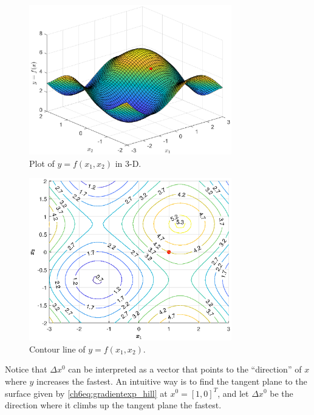 \begin{figure}
	\centering
	\includegraphics[width=250pt]{chapters/chapter6/figures/gradientexp_3d.eps}
	\caption{Plot of $y=f(x_1, x_2)$ in 3-D.} \label{ch6fig:gradientexp_3d}
\end{figure}
\begin{figure}
	\centering
	\includegraphics[width=250pt]{chapters/chapter6/figures/gradientexp_contour.eps}
	\caption{Contour line of $y=f(x_1, x_2)$.} \label{ch6fig:gradientexp_contour}
\end{figure}

Notice that $\Delta x^0$ can be interpreted as a vector that points to the ``direction'' of $x$ where $y$ increases the fastest. An intuitive way is to find the tangent plane to the surface given by \eqref{ch6eq:gradientexp_hill} at $x^0=[1,0]^T$, and let $\Delta x^0$ be the direction where it climbs up the tangent plane the fastest.


